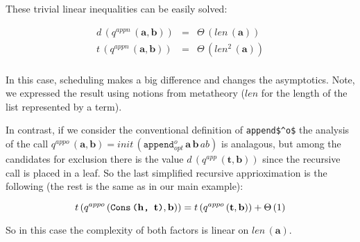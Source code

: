 These trivial linear inequalities can be easily solved:

\[
\begin{array}{lcl}
d\,(q^{appn}\,(\mathbf{a}, \mathbf{b})) & = & \Theta\,(len\,(\mathbf{a})) \\
t\,(q^{appn}\,(\mathbf{a}, \mathbf{b})) & = & \Theta\,(len^2\,(\mathbf{a})) \\
\end{array}
 \]
 
In this case, scheduling makes a big difference and changes the asymptotics. Note, we expressed the result using notions from metatheory
($len$ for the length of the list represented by a term).

In contrast, if we consider the conventional definition of \lstinline|append$^o$| the analysis of the call
$q^{appo}\,(\mathbf{a}, \mathbf{b}) = init\,(\texttt{append$^o_{opt}$} \, \mathbf{a} \, \mathbf{b} \, ab)$ is analagous,
but among the candidates for exclusion there is the value $d\,(q^{app}\,(\mathbf{t}, \mathbf{b}))$ since the recursive
call is placed in a leaf. So the last simplified recursive apprioximation is the following (the rest is
the same as in our main example):

\[t\,(q^{appo}\,(\texttt{Cons\,($\mathbf{h}$, $\mathbf{t}$)}, \mathbf{b})) = t\,(q^{appo}\,(\mathbf{t}, \mathbf{b})) + \Theta\,(1) \]

So in this case the complexity of both factors is linear on $len\,(\mathbf{a})$.

